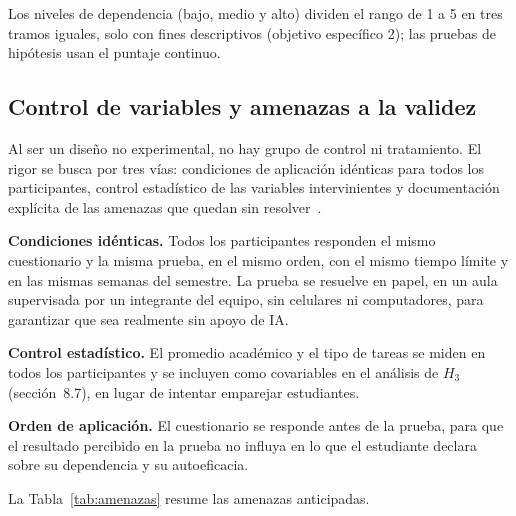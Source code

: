 \documentclass[12pt,letterpaper]{article}
\numberwithin{table}{section}
\numberwithin{figure}{section}
\begin{document}
Los niveles de dependencia (bajo, medio y alto) dividen el rango de 1 a 5 en tres tramos iguales, solo con fines descriptivos (objetivo específico 2); las pruebas de hipótesis usan el puntaje continuo.

\subsection{Control de variables y amenazas a la validez}

Al ser un diseño no experimental, no hay grupo de control ni tratamiento. El rigor se busca por tres vías: condiciones de aplicación idénticas para todos los participantes, control estadístico de las variables intervinientes y documentación explícita de las amenazas que quedan sin resolver~\cite{hernandez2014metodologia,campbell1963experimental}.

\textbf{Condiciones idénticas.} Todos los participantes responden el mismo cuestionario y la misma prueba, en el mismo orden, con el mismo tiempo límite y en las mismas semanas del semestre. La prueba se resuelve en papel, en un aula supervisada por un integrante del equipo, sin celulares ni computadores, para garantizar que sea realmente sin apoyo de IA.

\textbf{Control estadístico.} El promedio académico y el tipo de tareas se miden en todos los participantes y se incluyen como covariables en el análisis de $H_3$ (sección~8.7), en lugar de intentar emparejar estudiantes.

\textbf{Orden de aplicación.} El cuestionario se responde antes de la prueba, para que el resultado percibido en la prueba no influya en lo que el estudiante declara sobre su dependencia y su autoeficacia.

La Tabla~\ref{tab:amenazas} resume las amenazas anticipadas.
\end{document}
